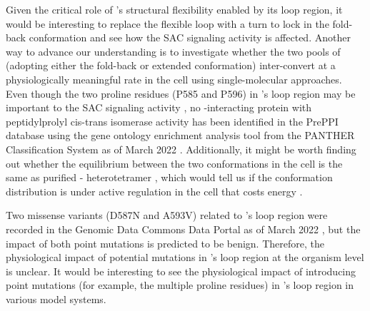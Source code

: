 Given the critical role of 's structural flexibility enabled by its loop region, it would be interesting to replace the flexible loop with a turn to lock  in the fold-back conformation and see how the SAC signaling activity is affected. Another way to advance our understanding is to investigate whether the two pools of  (adopting either the fold-back or extended conformation) inter-convert at a physiologically meaningful rate in the cell using single-molecular approaches. Even though the two proline residues (P585 and P596) in ’s loop region may be important to the SAC signaling activity , no -interacting protein with peptidylprolyl cis-trans isomerase activity has been identified in the PrePPI database using the gene ontology enrichment analysis tool from the PANTHER Classification System as of March 2022 \cite{PrePPI, PANTHER}. Additionally, it might be worth finding out whether the equilibrium between the two conformations in the cell is the same as purified - heterotetramer , which would tell us if the conformation distribution is under active regulation in the cell that costs energy \cite{MAD2Dynamics}. %

Two missense variants (D587N and A593V) related to ’s loop region were recorded in the Genomic Data Commons Data Portal as of March 2022 \cite{GDC}, but the impact of both point mutations is predicted to be benign. Therefore, the physiological impact of potential mutations in ’s loop region at the organism level is unclear. It would be interesting to see the physiological impact of introducing point mutations (for example, the multiple proline residues) in ’s loop region in various model systems.

